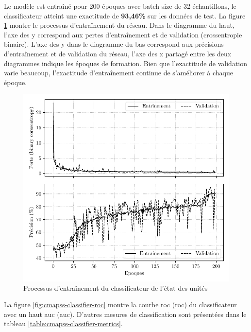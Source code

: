 Le modèle est entraîné pour 200 époques avec batch size de 32 échantillons, le classificateur atteint une exactitude de \textbf{93,46\%} sur les données de test. La figure \ref{fig:cmapss-classifier-training} montre le processus d'entraînement du réseau. Dans le diagramme du haut, l'axe des y correspond aux pertes d'entraînement et de validation (crossentropie binaire). L'axe des y dans le diagramme du bas correspond aux précisions d'entraînement et de validation du réseau, l'axe des x partagé entre les deux diagrammes indique les époques de formation. Bien que l'exactitude de validation varie beaucoup, l'exactitude d'entraînement continue de s'améliorer à chaque époque.

\begin{figure}[H]
    \centering
    \includegraphics{figures/cmapss_classification_training_fr.pdf}
    \caption{Processus d'entraînement du classificateur de l'état des unités}
    \label{fig:cmapss-classifier-training}
\end{figure}

La figure \ref{fig:cmapss-classifier-roc} montre la courbe \acrlong{roc} (\acrshort{roc}) du classificateur avec un haut \acrlong{auc} (\acrshort{auc}). D'autres mesures de classification sont présentées dans le tableau \ref{table:cmapss-classifier-metrics}.

